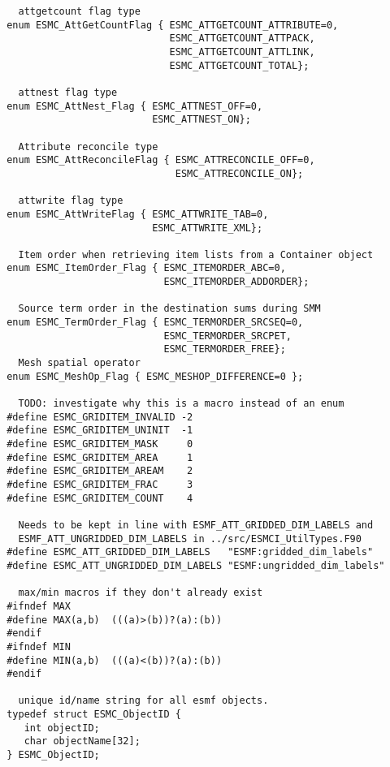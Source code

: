 \begin{verbatim}
   attgetcount flag type
 enum ESMC_AttGetCountFlag { ESMC_ATTGETCOUNT_ATTRIBUTE=0,
                             ESMC_ATTGETCOUNT_ATTPACK,
                             ESMC_ATTGETCOUNT_ATTLINK,
                             ESMC_ATTGETCOUNT_TOTAL};
                         
   attnest flag type
 enum ESMC_AttNest_Flag { ESMC_ATTNEST_OFF=0,
                          ESMC_ATTNEST_ON};
 
   Attribute reconcile type
 enum ESMC_AttReconcileFlag { ESMC_ATTRECONCILE_OFF=0,
                              ESMC_ATTRECONCILE_ON};
 
   attwrite flag type
 enum ESMC_AttWriteFlag { ESMC_ATTWRITE_TAB=0,
                          ESMC_ATTWRITE_XML};
 
   Item order when retrieving item lists from a Container object
 enum ESMC_ItemOrder_Flag { ESMC_ITEMORDER_ABC=0,
                            ESMC_ITEMORDER_ADDORDER};
 
   Source term order in the destination sums during SMM
 enum ESMC_TermOrder_Flag { ESMC_TERMORDER_SRCSEQ=0,
                            ESMC_TERMORDER_SRCPET,
                            ESMC_TERMORDER_FREE};
   Mesh spatial operator
 enum ESMC_MeshOp_Flag { ESMC_MESHOP_DIFFERENCE=0 };
 
   TODO: investigate why this is a macro instead of an enum
 #define ESMC_GRIDITEM_INVALID -2
 #define ESMC_GRIDITEM_UNINIT  -1
 #define ESMC_GRIDITEM_MASK     0
 #define ESMC_GRIDITEM_AREA     1
 #define ESMC_GRIDITEM_AREAM    2
 #define ESMC_GRIDITEM_FRAC     3
 #define ESMC_GRIDITEM_COUNT    4
 
   Needs to be kept in line with ESMF_ATT_GRIDDED_DIM_LABELS and
   ESMF_ATT_UNGRIDDED_DIM_LABELS in ../src/ESMCI_UtilTypes.F90
 #define ESMC_ATT_GRIDDED_DIM_LABELS   "ESMF:gridded_dim_labels"
 #define ESMC_ATT_UNGRIDDED_DIM_LABELS "ESMF:ungridded_dim_labels"
 
   max/min macros if they don't already exist
 #ifndef MAX
 #define MAX(a,b)  (((a)>(b))?(a):(b))
 #endif
 #ifndef MIN
 #define MIN(a,b)  (((a)<(b))?(a):(b))
 #endif
 
   unique id/name string for all esmf objects.
 typedef struct ESMC_ObjectID { 
    int objectID; 
    char objectName[32]; 
 } ESMC_ObjectID;
 

\end{verbatim}
